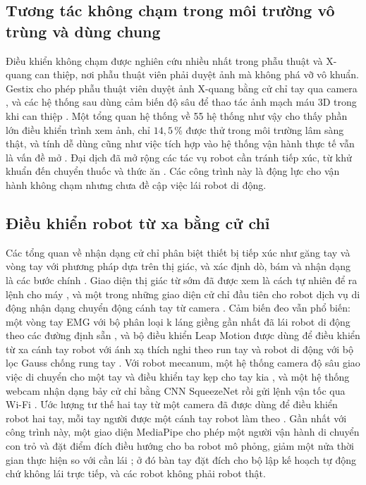 \documentclass[5p,twocolumn]{elsarticle}
\begin{document}
\subsection{Tương tác không chạm trong môi trường vô trùng và dùng chung}
Điều khiển không chạm được nghiên cứu nhiều nhất trong phẫu thuật và X-quang can thiệp, nơi phẫu thuật viên phải duyệt ảnh mà không phá vỡ vô khuẩn. Gestix cho phép phẫu thuật viên duyệt ảnh X-quang bằng cử chỉ tay qua camera \cite{wachs2008}, và các hệ thống sau dùng cảm biến độ sâu để thao tác ảnh mạch máu 3D trong khi can thiệp \cite{ohara2014}. Một tổng quan hệ thống về 55 hệ thống như vậy cho thấy phần lớn điều khiển trình xem ảnh, chỉ $14{,}5$\,\% được thử trong môi trường lâm sàng thật, và tính dễ dùng cũng như việc tích hợp vào hệ thống vận hành thực tế vẫn là vấn đề mở \cite{mewes2017}. Đại dịch đã mở rộng các tác vụ robot cần tránh tiếp xúc, từ khử khuẩn đến chuyển thuốc và thức ăn \cite{yang2020}. Các công trình này là động lực cho vận hành không chạm nhưng chưa đề cập việc lái robot di động.

\subsection{Điều khiển robot từ xa bằng cử chỉ}
Các tổng quan về nhận dạng cử chỉ phân biệt thiết bị tiếp xúc như găng tay và vòng tay với phương pháp dựa trên thị giác, và xác định dò, bám và nhận dạng là các bước chính \cite{mitra2007,rautaray2015,oudah2020}. Giao diện thị giác từ sớm đã được xem là cách tự nhiên để ra lệnh cho máy \cite{wachs2011}, và một trong những giao diện cử chỉ đầu tiên cho robot dịch vụ di động nhận dạng chuyển động cánh tay từ camera \cite{waldherr2000}. Cảm biến đeo vẫn phổ biến: một vòng tay EMG với bộ phân loại k láng giềng gần nhất đã lái robot di động theo các đường định sẵn \cite{bisi2018}, và bộ điều khiển Leap Motion được dùng để điều khiển từ xa cánh tay robot với ánh xạ thích nghi theo run tay \cite{bassily2014} và robot di động với bộ lọc Gauss chống rung tay \cite{chen2024}. Với robot mecanum, một hệ thống camera độ sâu giao việc di chuyển cho một tay và điều khiển tay kẹp cho tay kia \cite{luo2019}, và một hệ thống webcam nhận dạng bảy cử chỉ bằng CNN SqueezeNet rồi gửi lệnh vận tốc qua Wi-Fi \cite{zaman2023}. Ước lượng tư thế hai tay từ một camera đã được dùng để điều khiển robot hai tay, mỗi tay người được một cánh tay robot làm theo \cite{gao2023}. Gần nhất với công trình này, một giao diện MediaPipe cho phép một người vận hành di chuyển con trỏ và đặt điểm đích điều hướng cho ba robot mô phỏng, giảm một nửa thời gian thực hiện so với cần lái \cite{zick2024}; ở đó bàn tay đặt đích cho bộ lập kế hoạch tự động chứ không lái trực tiếp, và các robot không phải robot thật.
\end{document}
